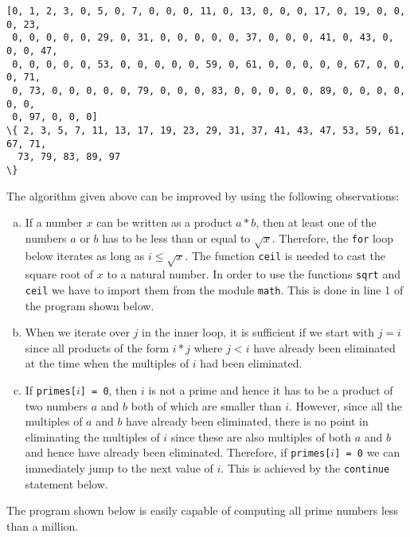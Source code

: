 \begin{Verbatim}[commandchars=\\\{\}]
[0, 1, 2, 3, 0, 5, 0, 7, 0, 0, 0, 11, 0, 13, 0, 0, 0, 17, 0, 19, 0, 0, 0, 23,
 0, 0, 0, 0, 0, 29, 0, 31, 0, 0, 0, 0, 0, 37, 0, 0, 0, 41, 0, 43, 0, 0, 0, 47,
 0, 0, 0, 0, 0, 53, 0, 0, 0, 0, 0, 59, 0, 61, 0, 0, 0, 0, 0, 67, 0, 0, 0, 71,
 0, 73, 0, 0, 0, 0, 0, 79, 0, 0, 0, 83, 0, 0, 0, 0, 0, 89, 0, 0, 0, 0, 0, 0,
 0, 97, 0, 0, 0]
\{ 2, 3, 5, 7, 11, 13, 17, 19, 23, 29, 31, 37, 41, 43, 47, 53, 59, 61, 67, 71,
  73, 79, 83, 89, 97
\}
\end{Verbatim}
The algorithm given above can be improved by using the following observations:
\begin{enumerate}[(a)]
\item If a number $x$ can be written as a product $a * b$, then at least one of the numbers $a$ or $b$ has to
      be less than or equal to $\sqrt{x}$.  Therefore, the \texttt{for} loop below iterates as long as $i \leq
      \sqrt{x}$.
      The function \texttt{ceil} is needed to cast the square root of $x$ to a natural number.  In
      order to use the functions \texttt{sqrt} and \texttt{ceil} we have to import them from the module
      \texttt{math}.   This is done in line 1 of the program shown below.  
\item When we iterate over $j$ in the inner loop, it is sufficient if we start with $j = i$ since all products
      of the form $i * j$ where $j < i$ have already been eliminated at the time when the multiples of $i$ had
      been eliminated. 
\item If \texttt{primes[$i$] = 0}, then $i$ is not a prime and hence it has to be a product of two numbers $a$
      and $b$ both of which are smaller than $i$.  However, since all the multiples of $a$ and $b$ have already
      been eliminated, there is no point in eliminating the multiples of $i$ since these are also multiples of both
      $a$ and $b$ and hence have already been eliminated.  Therefore, if \texttt{primes[$i$] = 0} we can
      immediately jump to the next value of $i$.  This is achieved by the \texttt{continue} statement 
      below. 
\end{enumerate}
The program shown below is easily capable of computing all prime numbers less than a million.

